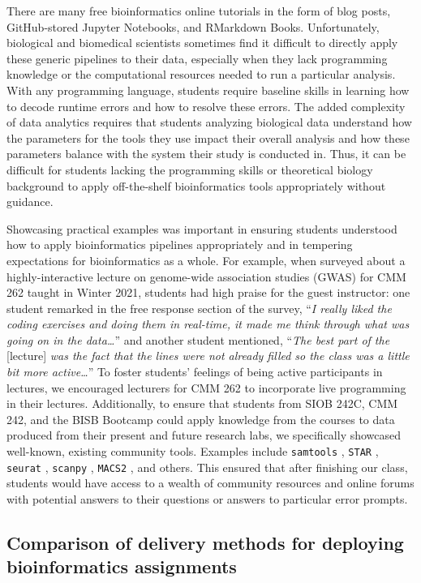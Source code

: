 There are many free bioinformatics online tutorials in the form of blog posts, GitHub-stored Jupyter Notebooks, and RMarkdown Books. Unfortunately, biological and biomedical scientists sometimes find it difficult to directly apply these generic pipelines to their data, especially when they lack programming knowledge or the computational resources needed to run a particular analysis. With any programming language, students require baseline skills in learning how to decode runtime errors and how to resolve these errors. The added complexity of data analytics requires that students analyzing biological data understand how the parameters for the tools they use impact their overall analysis and how these parameters balance with the system their study is conducted in. Thus, it can be difficult for students lacking the programming skills or theoretical biology background to apply off-the-shelf bioinformatics tools appropriately without guidance. 

Showcasing practical examples was important in ensuring students understood how to apply bioinformatics pipelines appropriately and in tempering expectations for bioinformatics as a whole. For example, when surveyed about a highly-interactive lecture on genome-wide association studies (GWAS) for CMM 262 taught in Winter 2021, students had high praise for the guest instructor: one student remarked in the free response section of the survey, “\textit{I really liked the coding exercises and doing them in real-time, it made me think through what was going on in the data…}” and another student mentioned, “\textit{The best part of the} [lecture] \textit{was the fact that the lines were not already filled so the class was a little bit more active…}” To foster students' feelings of being active participants in lectures, we encouraged lecturers for CMM 262 to incorporate live programming in their lectures. Additionally, to ensure that students from SIOB 242C, CMM 242, and the BISB Bootcamp could apply knowledge from the courses to data produced from their present and future research labs, we specifically showcased well-known, existing community tools. Examples include \verb|samtools| \cite{danecek2021}, \verb|STAR| \cite{dobin2013}, \verb|seurat| \cite{hao2021}, \verb|scanpy| \cite{wolf2018}, \verb|MACS2| \cite{zhang2008}, and others. This ensured that after finishing our class, students would have access to a wealth of community resources and online forums with potential answers to their questions or answers to particular error prompts.

\subsection{Comparison of delivery methods for deploying bioinformatics assignments}

